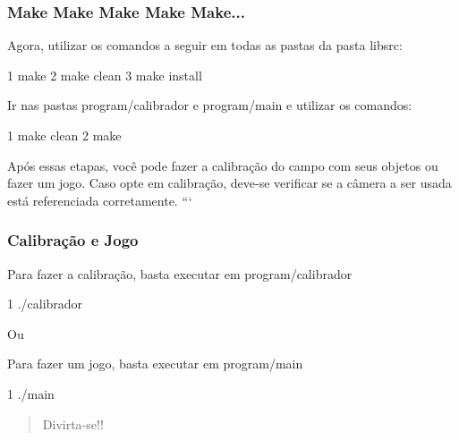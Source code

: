 \subsubsection*{Make Make Make Make Make...}

Agora, utilizar os comandos a seguir em todas as pastas da pasta {\ttfamily libsrc}\+: 
\begin{DoxyCode}
1 make
2 make clean
3 make install
\end{DoxyCode}


Ir nas pastas {\ttfamily program/calibrador} e {\ttfamily program/main} e utilizar os comandos\+: 
\begin{DoxyCode}
1 make clean
2 make 
\end{DoxyCode}


Após essas etapas, você pode fazer a {\ttfamily calibração} do campo com seus objetos ou fazer um jogo. Caso opte em calibração, deve-\/se verificar se a câmera a ser usada está referenciada corretamente. ``` \subsubsection*{Calibração e Jogo}

Para fazer a calibração, basta executar em {\ttfamily program/calibrador} 
\begin{DoxyCode}
1 ./calibrador
\end{DoxyCode}


Ou

Para fazer um jogo, basta executar em {\ttfamily program/main} 
\begin{DoxyCode}
1 ./main
\end{DoxyCode}
 \begin{quote}
Divirta-\/se!!\end{quote}
